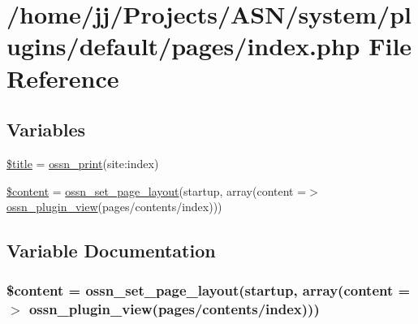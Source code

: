 \hypertarget{system_2plugins_2default_2pages_2index_8php}{}\section{/home/jj/\+Projects/\+A\+S\+N/system/plugins/default/pages/index.php File Reference}
\label{system_2plugins_2default_2pages_2index_8php}
\subsection*{Variables}
\begin{DoxyCompactItemize}
\item 
\hyperlink{system_2plugins_2default_2pages_2index_8php_ada57e7bb7c152edad18fe2f166188691}{\$title} = \hyperlink{ossn_8lib_8languages_8php_a2be5d1c4b695593a9b9067b96df2150a}{ossn\+\_\+print}(\textquotesingle{}site\+:index\textquotesingle{})
\item 
\hyperlink{system_2plugins_2default_2pages_2index_8php_a57b284fe00866494b33afa80ba729bed}{\$content} = \hyperlink{ossn_8lib_8views_8php_aaac231ebc8646d7c939acd667caaeb6a}{ossn\+\_\+set\+\_\+page\+\_\+layout}(\textquotesingle{}startup\textquotesingle{}, array(\textquotesingle{}content\textquotesingle{} =$>$ \hyperlink{ossn_8lib_8plugins_8php_a09131ff3382e758ec6dba7bb2ea3ae32}{ossn\+\_\+plugin\+\_\+view}(\textquotesingle{}pages/contents/index\textquotesingle{})))
\end{DoxyCompactItemize}


\subsection{Variable Documentation}
\subsubsection[{\texorpdfstring{\$content}{$content}}]{\setlength{\rightskip}{0pt plus 5cm}\$content = {\bf ossn\+\_\+set\+\_\+page\+\_\+layout}(\textquotesingle{}startup\textquotesingle{}, array(\textquotesingle{}content\textquotesingle{} =$>$ {\bf ossn\+\_\+plugin\+\_\+view}(\textquotesingle{}pages/contents/index\textquotesingle{})))}\hypertarget{system_2plugins_2default_2pages_2index_8php_a57b284fe00866494b33afa80ba729bed}{}\label{system_2plugins_2default_2pages_2index_8php_a57b284fe00866494b33afa80ba729bed}


